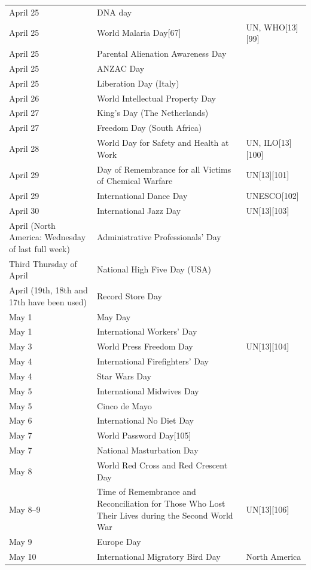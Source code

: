 \documentclass[
  openany]{book}
\begin{document}
\begin{longtable}[t]{>{\raggedright\arraybackslash}p{8em}>{\raggedright\arraybackslash}p{20em}>{\raggedright\arraybackslash}p{12em}}
\addlinespace
April 25 & DNA day & \\
April 25 & World Malaria Day[67] & UN, WHO[13][99]\\
April 25 & Parental Alienation Awareness Day & \\
April 25 & ANZAC Day & \\
April 25 & Liberation Day (Italy) & \\
\addlinespace
April 26 & World Intellectual Property Day & \\
April 27 & King's Day (The Netherlands) & \\
April 27 & Freedom Day (South Africa) & \\
April 28 & World Day for Safety and Health at Work & UN, ILO[13][100]\\
April 29 & Day of Remembrance for all Victims of Chemical Warfare & UN[13][101]\\
\addlinespace
April 29 & International Dance Day & UNESCO[102]\\
April 30 & International Jazz Day & UN[13][103]\\
April (North America: Wednesday of last full week) & Administrative Professionals' Day & \\
Third Thursday of April & National High Five Day (USA) & \\
April (19th, 18th and 17th have been used) & Record Store Day & \\
\addlinespace
May 1 & May Day & \\
May 1 & International Workers' Day & \\
May 3 & World Press Freedom Day & UN[13][104]\\
May 4 & International Firefighters' Day & \\
May 4 & Star Wars Day & \\
\addlinespace
May 5 & International Midwives Day & \\
May 5 & Cinco de Mayo & \\
May 6 & International No Diet Day & \\
May 7 & World Password Day[105] & \\
May 7 & National Masturbation Day & \\
\addlinespace
May 8 & World Red Cross and Red Crescent Day & \\
May 8–9 & Time of Remembrance and Reconciliation for Those Who Lost Their Lives during the Second World War & UN[13][106]\\
May 9 & Europe Day & \\
May 10 & International Migratory Bird Day & North America\\

\end{longtable}
\end{document}

